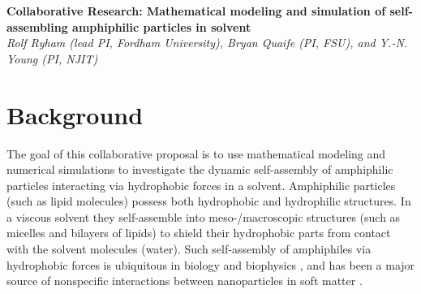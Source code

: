 \noindent
{\bf Collaborative Research: Mathematical modeling and simulation of
self-assembling amphiphilic particles in solvent} \\
{\em Rolf Ryham (lead PI, Fordham University), Bryan Quaife (PI,
FSU), and Y.-N. Young (PI, NJIT)}
\section{Background}
\label{sec:background}
The goal of this collaborative proposal is to use mathematical modeling
and numerical simulations to investigate the dynamic self-assembly of
amphiphilic particles interacting via hydrophobic forces
in a solvent. Amphiphilic particles (such as lipid molecules) possess
both hydrophobic and hydrophilic structures. In a viscous solvent they
self-assemble into meso-/macroscopic structures (such as micelles and
bilayers of lipids) to shield their hydrophobic parts from contact with
the solvent molecules (water).
%
%
Such self-assembly of amphiphiles via hydrophobic forces is ubiquitous in biology and biophysics \cite{Israelachvili1954},
and has been a major source of nonspecific interactions between
nanoparticles in soft matter
\cite{Sanchez-IglesiasEtAl2012_ACSNano,AltantzisEtAl2013_PSC,XieYangLuEtAl2020_COCIS}. 



